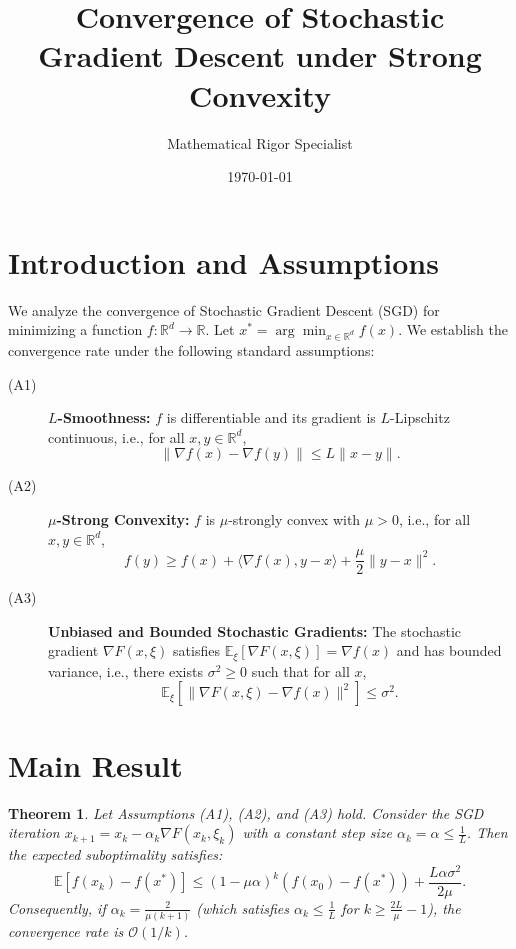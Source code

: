 \documentclass[11pt]{article}
\newtheorem{theorem}{Theorem}
\begin{document}
\title{Convergence of Stochastic Gradient Descent under Strong Convexity}
\author{Mathematical Rigor Specialist}
\date{\today}
\maketitle

\section{Introduction and Assumptions}
We analyze the convergence of Stochastic Gradient Descent (SGD) for minimizing a function $f: \mathbb{R}^d \to \mathbb{R}$. Let $x^* = \arg\min_{x \in \mathbb{R}^d} f(x)$. We establish the convergence rate under the following standard assumptions:

\begin{description}
\item[(A1)] \textbf{$L$-Smoothness:} $f$ is differentiable and its gradient is $L$-Lipschitz continuous, i.e., for all $x, y \in \mathbb{R}^d$,
\[ \|\nabla f(x) - \nabla f(y)\| \le L \|x - y\|. \]
\item[(A2)] \textbf{$\mu$-Strong Convexity:} $f$ is $\mu$-strongly convex with $\mu > 0$, i.e., for all $x, y \in \mathbb{R}^d$,
\[ f(y) \ge f(x) + \langle \nabla f(x), y - x \rangle + \frac{\mu}{2} \|y - x\|^2. \]
\item[(A3)] \textbf{Unbiased and Bounded Stochastic Gradients:} The stochastic gradient $\nabla F(x, \xi)$ satisfies $\mathbb{E}_\xi[\nabla F(x, \xi)] = \nabla f(x)$ and has bounded variance, i.e., there exists $\sigma^2 \ge 0$ such that for all $x$,
\[ \mathbb{E}_\xi[\|\nabla F(x, \xi) - \nabla f(x)\|^2] \le \sigma^2. \]
\end{description}

\section{Main Result}

\begin{theorem}
Let Assumptions (A1), (A2), and (A3) hold. Consider the SGD iteration $x_{k+1} = x_k - \alpha_k \nabla F(x_k, \xi_k)$ with a constant step size $\alpha_k = \alpha \le \frac{1}{L}$. Then the expected suboptimality satisfies:
\[ \mathbb{E}[f(x_k) - f(x^*)] \le \left(1 - \mu \alpha\right)^k (f(x_0) - f(x^*)) + \frac{L \alpha \sigma^2}{2 \mu}. \]
Consequently, if $\alpha_k = \frac{2}{\mu(k+1)}$ (which satisfies $\alpha_k \le \frac{1}{L}$ for $k \ge \frac{2L}{\mu} - 1$), the convergence rate is $\mathcal{O}(1/k)$.
\end{theorem}
\end{document}
